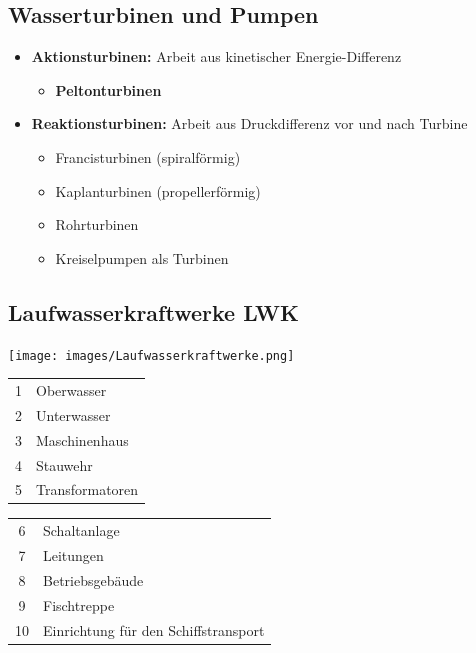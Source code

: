 \subsection{Wasserturbinen und Pumpen}

\begin{itemize}
    \item \textbf{Aktionsturbinen:} Arbeit aus kinetischer Energie-Differenz
    \begin{itemize}
        \item \textbf{Peltonturbinen}
    \end{itemize}

\item \textbf{Reaktionsturbinen:} Arbeit aus Druckdifferenz vor und nach Turbine
    \begin{itemize}
        \item Francisturbinen (spiralförmig)
        \item Kaplanturbinen (propellerförmig)
        \item Rohrturbinen
        \item Kreiselpumpen als Turbinen
    \end{itemize}
\end{itemize}



\subsection{Laufwasserkraftwerke LWK}

\begin{center}
    \texttt{[image: images/Laufwasserkraftwerke.png]}
\end{center}

\begin{minipage}[c]{0.38\columnwidth}
    \begin{tabular}{c l}
        1 & Oberwasser \\ 
        2 & Unterwasser \\ 
        3 & Maschinenhaus \\
        4 & Stauwehr \\
        5 & Transformatoren \\
    \end{tabular}
\end{minipage}
\hfill
\begin{minipage}[c]{0.58\columnwidth}
    \begin{tabular}{c l}
        6 & Schaltanlage \\
        7 & Leitungen \\
        8 & Betriebsgebäude \\
        9 & Fischtreppe \\
        10 & Einrichtung für den Schiffstransport \\
    \end{tabular}
\end{minipage}



